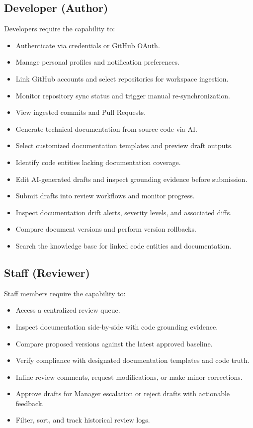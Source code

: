 \subsection{Developer (Author)}
Developers require the capability to:
\begin{itemize}
	\item Authenticate via credentials or GitHub OAuth.
	\item Manage personal profiles and notification preferences.
	\item Link GitHub accounts and select repositories for workspace ingestion.
	\item Monitor repository sync status and trigger manual re-synchronization.
	\item View ingested commits and Pull Requests.
	\item Generate technical documentation from source code via AI.
	\item Select customized documentation templates and preview draft outputs.
	\item Identify code entities lacking documentation coverage.
	\item Edit AI-generated drafts and inspect grounding evidence before submission.
	\item Submit drafts into review workflows and monitor progress.
	\item Inspect documentation drift alerts, severity levels, and associated diffs.
	\item Compare document versions and perform version rollbacks.
	\item Search the knowledge base for linked code entities and documentation.
\end{itemize}

\subsection{Staff (Reviewer)}
Staff members require the capability to:
\begin{itemize}
	\item Access a centralized review queue.
	\item Inspect documentation side-by-side with code grounding evidence.
	\item Compare proposed versions against the latest approved baseline.
	\item Verify compliance with designated documentation templates and code truth.
	\item Inline review comments, request modifications, or make minor corrections.
	\item Approve drafts for Manager escalation or reject drafts with actionable feedback.
	\item Filter, sort, and track historical review logs.
\end{itemize}

